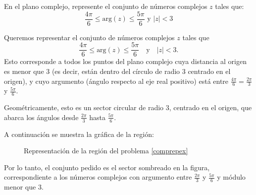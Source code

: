 \begin{prob}\label{comprepex} En el plano complejo, represente el conjunto de números complejos $z$ tales que:
$$\dfrac{4\pi}{6}\leq\text{arg}(z)\leq\dfrac{5\pi}{6} \text{ y } |z|<3$$
\begin{myproof}
Queremos representar el conjunto de números complejos $z$ tales que
\[
\dfrac{4\pi}{6}\leq\text{arg}(z)\leq\dfrac{5\pi}{6} \quad \text{y} \quad |z|<3.
\]
Esto corresponde a todos los puntos del plano complejo cuya distancia al origen es menor que $3$ (es decir, están dentro del círculo de radio $3$ centrado en el origen), y cuyo argumento (ángulo respecto al eje real positivo) está entre $\frac{4\pi}{6} = \frac{2\pi}{3}$ y $\frac{5\pi}{6}$.

Geométricamente, esto es un sector circular de radio $3$, centrado en el origen, que abarca los ángulos desde $\frac{2\pi}{3}$ hasta $\frac{5\pi}{6}$.

A continuación se muestra la gráfica de la región:

\begin{figure}[H]
\centering
{}
\caption{Representación de la región del problema \ref{comprepex}}
\end{figure}

Por lo tanto, el conjunto pedido es el sector sombreado en la figura, correspondiente a los números complejos con argumento entre $\frac{2\pi}{3}$ y $\frac{5\pi}{6}$ y módulo menor que $3$.
\end{myproof}

\end{prob}

